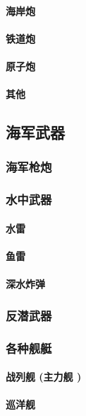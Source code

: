 \documentclass[UTF8]{../ApplicationUniverse}
\begin{document}
            \paragraph{海岸炮}
            \paragraph{铁道炮}
            \paragraph{原子炮}
            \paragraph{其他}
    \subsection{海军武器}
        \subsubsection{海军枪炮}
        \subsubsection{水中武器}
            \paragraph{水雷}
            \paragraph{鱼雷}
            \paragraph{深水炸弹}
        \subsubsection{反潜武器}
        \subsubsection{各种舰艇}
            \paragraph{战列舰 (主力舰 )}
            \paragraph{巡洋舰}
\end{document}
